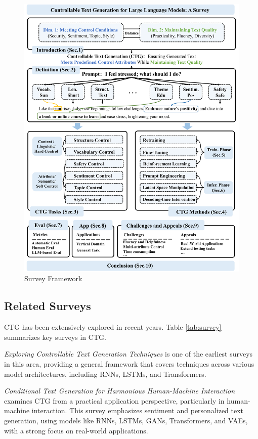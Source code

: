 \documentclass[acmsmall, screen]{acmart}
\begin{document}
\begin{figure}[htbp]
    \centering
    \includegraphics[width=\textwidth]{figures/framework.pdf}
    \caption{Survey Framework}
    \label{fig:framework}
\end{figure}

\subsection{Related Surveys}

CTG has been extensively explored in recent years. Table \ref{tab:survey} summarizes key surveys in CTG.

\textit{Exploring Controllable Text Generation Techniques} \cite{prabhumoye_COLING20_CTGSurvey} is one of the earliest surveys in this area, providing a general framework that covers techniques across various model architectures, including RNNs, LSTMs, and Transformers.

\textit{Conditional Text Generation for Harmonious Human-Machine Interaction} \cite{guo_TIST21_HMI} examines CTG from a practical application perspective, particularly in human-machine interaction. This survey emphasizes sentiment and personalized text generation, using models like RNNs, LSTMs, GANs, Transformers, and VAEs, with a strong focus on real-world applications.
\end{document}
